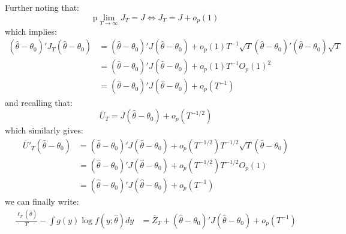 Further noting that:
\[
\text{p}\lim_{T\rightarrow\infty} J_T=J \Leftrightarrow J_T=J+o_p(1)
\]
which implies:
\begin{align*}
 (\widehat{\theta}-\theta_0)'  J_T  (\widehat{\theta}-\theta_0) &=  (\widehat{\theta}-\theta_0)'  J (\widehat{\theta}-\theta_0) +o_p\left(1\right)T^{-1}\sqrt{T}(\widehat{\theta}-\theta_0)'(\widehat{\theta}-\theta_0)\sqrt{T} \\
&= (\widehat{\theta}-\theta_0)'  J  (\widehat{\theta}-\theta_0) +o_p\left(1\right)T^{-1}O_p\left(1\right)^2\\
&= (\widehat{\theta}-\theta_0)'  J  (\widehat{\theta}-\theta_0) +o_p\left(T^{-1}\right)
\end{align*}
and recalling that:
\[
\bar{U}_T=J (\widehat{\theta}-\theta_0 )+o_p\left(T^{-1/2}\right)
\]
which similarly gives:
\begin{align*}
\bar{U}'_T (\widehat{\theta}-\theta_0)&=  (\widehat{\theta}-\theta_0)'  J  (\widehat{\theta}-\theta_0) +o_p\left(T^{-1/2}\right)T^{-1/2}\sqrt{T}(\widehat{\theta}-\theta_0) \\
&= (\widehat{\theta}-\theta_0)'  J (\widehat{\theta}-\theta_0) +o_p\left(T^{-1/2}\right)T^{-1/2}O_p\left(1\right)\\
&= (\widehat{\theta}-\theta_0)'  J  (\widehat{\theta}-\theta_0) +o_p\left(T^{-1}\right)
\end{align*}
we can finally write:
\begin{align*}
\frac{\ell_{T}(\widehat{\theta})}{T}-\int g(y)\log f(y;\widehat{\theta})dy &= \bar{Z}_T+\left(\widehat{\theta}-\theta_0\right)'  J \left(\widehat{\theta}-\theta_0\right)  + o_p\left(T^{-1}\right)
\end{align*}

